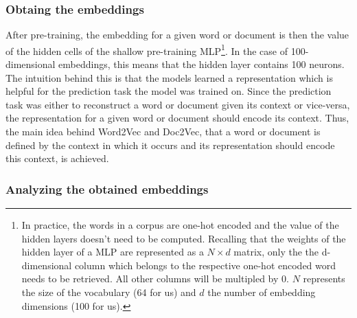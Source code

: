 \subsubsection{Obtaing the embeddings}
After pre-training, the embedding for a given word or document is then the value of the hidden cells of the shallow pre-training MLP\footnote{In practice, the words in a corpus are one-hot encoded and the value of the hidden layers doesn't need to be computed. Recalling that the weights of the hidden layer of a MLP are represented as a $N\times d$ matrix, only the the d-dimensional column which belongs to the respective one-hot encoded word needs to be retrieved. All other columns will be multipled by 0. $N$ represents the size of the vocabulary (64 for us) and $d$ the number of embedding dimensions (100 for us).}. In the case of 100-dimensional embeddings, this means that the hidden layer contains 100 neurons. The intuition behind this is that the models learned a representation which is helpful for the prediction task the model was trained on. Since the prediction task was either to reconstruct a word or document given its context or vice-versa, the representation for a given word or document should encode its context. Thus, the main idea behind Word2Vec and Doc2Vec, that a word or document is defined by the context in which it occurs and its representation should encode this context, is achieved.



\subsubsection{Analyzing the obtained embeddings}



